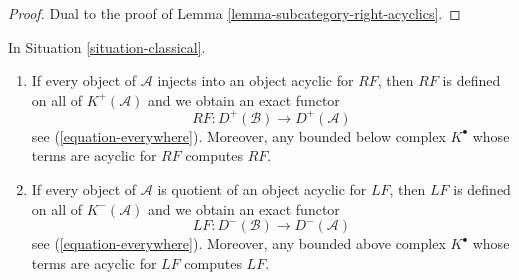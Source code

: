 \begin{proof}
Dual to the proof of
Lemma \ref{lemma-subcategory-right-acyclics}.
\end{proof}

\begin{proposition}
\label{proposition-enough-acyclics}
In
Situation \ref{situation-classical}.
\begin{enumerate}
\item If every object of $\mathcal{A}$ injects into an object acyclic
for $RF$, then $RF$ is defined on all of $K^{+}(\mathcal{A})$
and we obtain an exact functor
$$
RF : D^{+}(\mathcal{B}) \longrightarrow D^{+}(\mathcal{A})
$$
see (\ref{equation-everywhere}). Moreover, any bounded below complex
$K^\bullet$ whose terms are acyclic for $RF$ computes $RF$.
\item If every object of $\mathcal{A}$ is quotient of
an object acyclic for $LF$, then $LF$ is defined on all of
$K^{-}(\mathcal{A})$ and we obtain an exact functor
$$
LF : D^{-}(\mathcal{B}) \longrightarrow D^{-}(\mathcal{A})
$$
see (\ref{equation-everywhere}). Moreover, any bounded above complex
$K^\bullet$ whose terms are acyclic for $LF$ computes $LF$.
\end{enumerate}
\end{proposition}

